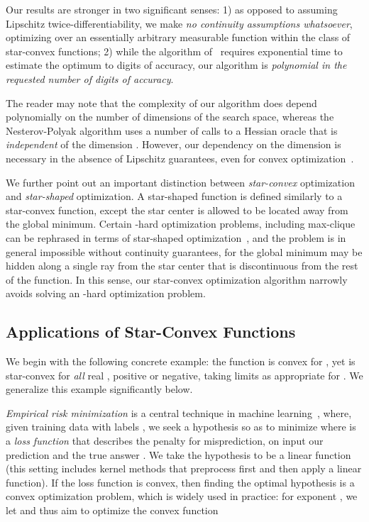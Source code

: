 \documentclass[11pt,letter]{article}
\numberwithin{nTheorems}{section}
\begin{document}
Our results are stronger in two significant senses: 1) as opposed to assuming Lipschitz twice-differentiability, we make \emph{no continuity assumptions whatsoever}, optimizing over an essentially arbitrary measurable function within the class of star-convex functions; 2) while the algorithm of~\cite{Nesterov:2006} requires exponential time to estimate the optimum to  digits of accuracy, our algorithm is \emph{polynomial in the requested number of digits of accuracy}.

The reader may note that the complexity of our algorithm does depend polynomially on the number of dimensions  of the search space, whereas the Nesterov-Polyak algorithm uses a number of calls to a Hessian oracle that is \emph{independent} of the dimension .
However, our dependency on the dimension  is necessary in the absence of Lipschitz guarantees, even for convex optimization~\cite{Nemirovskii:1983}.

We further point out an important distinction between \emph{star-convex} optimization and \emph{star-shaped} optimization.
A star-shaped function is defined similarly to a star-convex function, except the star center is allowed to be located away from the global minimum.
Certain \NP-hard optimization problems, including max-clique can be rephrased in terms of star-shaped optimization~\cite{MaxClique}, and the problem is in general impossible without continuity guarantees, for the global minimum may be hidden along a single ray from the star center that is discontinuous from the rest of the function. In this sense, our star-convex optimization algorithm narrowly avoids solving an \NP-hard optimization problem.

\subsection{Applications of Star-Convex Functions}

We begin with the following concrete example: the function  is convex for , yet is star-convex for \emph{all} real , positive or negative, taking limits as appropriate for . We generalize this example significantly below.

\emph{Empirical risk minimization} is a central technique in machine learning~\cite{Vapnik:2013}, where, given training data  with labels , we seek a hypothesis  so as to minimize  where  is a \emph{loss function} that describes the penalty for misprediction, on input our prediction  and the true answer . We take the hypothesis  to be a linear function (this setting includes kernel methods that preprocess  first and then apply a linear function). If the loss function  is convex, then finding the optimal hypothesis  is a convex optimization problem, which is widely used in practice: for exponent , we let  and thus aim to optimize the convex function 
\end{document}
